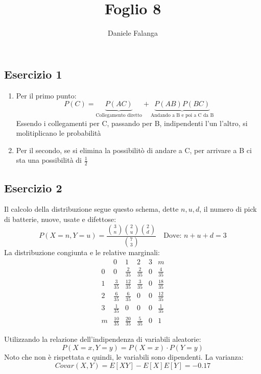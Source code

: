 \documentclass[12pt]{article}
\title{\textbf{Foglio 8}}
\author{Daniele Falanga}
\date{}
\begin{document}
\maketitle

\subsection*{Esercizio 1}

\begin{enumerate}
    \item Per il primo punto:
    \[
    P(C) = \underbrace{P(AC)}_{\text{Collegamento diretto}} + \underbrace{P(AB)P(BC)}_{\text{Andando a B e poi a C da B}}    
    \]
    Essendo i collegamenti per C, passando per B, indipendenti l'un l'altro, si molitiplicano le probabilità
    \item Per il secondo, se si elimina la possibilitò di andare a C, per arrivare a B ci sta una possibilità di \(\frac{1}{2}\)
\end{enumerate}

\newpage
\subsection*{Esercizio 2}
Il calcolo della distribuzione segue questo schema, dette \(n,u,d\), il numero di pick di batterie, nuove, usate e difettose:
\[
P(X=n,Y=u) = \frac{\binom{3}{n} \binom{2}{u} \binom{2}{d}}{\binom{7}{3}}    \quad \text{Dove: } n+u+d = 3
\]
La distribuzione congiunta e le relative marginali:
\begin{equation*}
    \renewcommand{\arraystretch}{1.5}
    \begin{array}{c|cccc|c}
          & 0 & 1 & 2 & 3 & m\\
    \hline
    0 & 0 & \frac{2}{35} & \frac{2}{35} & 0 & \frac{4}{35}\\
    1 & \frac{3}{35} & \frac{12}{35} & \frac{3}{35} & 0 & \frac{18}{35} \\
    2 & \frac{6}{35} & \frac{6}{35} & 0 & 0 & \frac{12}{35}\\ 
    3 & \frac{1}{35} & 0 & 0 & 0 & \frac{1}{35}\\
    \hline
    m & \frac{10}{35} & \frac{20}{35} & \frac{5}{35} & 0 & 1 
    \end{array}
\end{equation*}

Utilizzando la relazione dell'indipendenza di variabili aleatorie:
\[
P(X=x,Y=y) = P(X=x)\cdot P(Y=y)    
\]
Noto che non è rispettata e quindi, le variabili sono dipendenti.
La varianza:
\[
Covar(X,Y) = E[XY] - E[X]E[Y] = -0.17    
\] 
\end{document}
